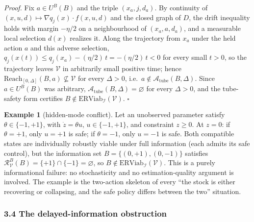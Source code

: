 \documentclass[11pt]{article}
\theoremstyle{definition}
\newtheorem{example}{Example}
\begin{document}
\emph{Proof.} Fix \(a\in U^B(B)\) and the triple \((x_a,j,d_a)\). By
continuity of \((x,u,d)\mapsto\nabla q_j(x)\cdot f(x,u,d)\) and the closed
graph of \(D\), the drift inequality holds with margin \(-\eta/2\) on a
neighbourhood of \((x_a,a,d_a)\), and a measurable local selection
\(d(x)\) realizes it. Along the trajectory from \(x_a\) under the held
action \(a\) and this adverse selection,
\(q_j(x(t))\le q_j(x_a)-(\eta/2)\,t=-(\eta/2)\,t<0\) for every small
\(t>0\), so the trajectory leaves \(\mathcal V\) in arbitrarily small
positive time; hence \(\mathrm{Reach}_{[0,\Delta]}(B,a)\not\subseteq\mathcal V\)
for every \(\Delta>0\), i.e.\ \(a\notin\mathcal{A}_{\mathrm{tube}}(B,\Delta)\).
Since \(a\in U^B(B)\) was arbitrary,
\(\mathcal{A}_{\mathrm{tube}}(B,\Delta)=\varnothing\) for every
\(\Delta>0\), and the tube-safety form certifies
\(B\notin\mathrm{ERViab}_{\mathcal I}(\mathcal V)\). \ensuremath{\square}

\begin{example}[hidden-mode conflict]\label{ex:hidden-mode} Let an unobserved parameter satisfy
\(\theta \in \{-1, +1\}\), with \(\dot z = \theta u\),
\(u \in \{-1, +1\}\), and constraint \(z \ge 0\). At \(z = 0\): if
\(\theta = +1\), only \(u = +1\) is safe; if \(\theta = -1\), only
\(u = -1\) is safe. Both compatible states are individually robustly
viable under full information (each admits its safe control), but the
information set \(B = \{(0, +1), (0, -1)\}\) satisfies
\(\mathcal{R}_{\mathcal{V}}^B(B) = \{+1\} \cap \{-1\} = \varnothing\),
so \(B \notin \mathrm{ERViab}_{\mathcal{I}}(\mathcal{V})\). This is a
purely informational failure: no stochasticity and no estimation-quality
argument is involved. The example is the two-action skeleton of every
``the stock is either recovering or collapsing, and the safe policy
differs between the two'' situation.

\end{example}

\subsubsection{3.4 The delayed-information
obstruction}\label{the-delayed-information-obstruction}
\end{document}
